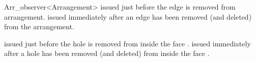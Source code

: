 \begin{ccRefClass}{Arr_observer<Arrangement>}
    {issued just before the edge  is removed from arrangement.}
\ccGlue
{}
    {issued immediately after an edge has been removed (and deleted)
     from the arrangement.}

    {issued just before the hole  is removed from inside the
     face .}
\ccGlue
{}
    {issued immediately after a hole has been removed (and deleted)
     from inside the face .}

\end{ccRefClass}

\ccRefPageEnd
